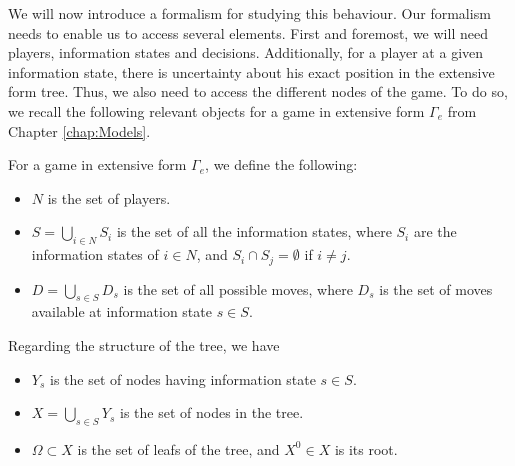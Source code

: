 We will now introduce a formalism for studying this behaviour. Our formalism needs to enable us to access several elements. First and foremost, we will need players, information states and decisions. Additionally, for  a player at a given information state, there is uncertainty about his exact position in the extensive form tree. Thus, we also need to access the different nodes of the game.
 To do so, we recall the following relevant objects for a game in extensive form $\Gamma_e$ from Chapter \ref{chap:Models}. \\

\begin{definition}
 For a game in extensive form $\Gamma_e$, we define the following:
\begin{itemize}
\item $N$ is the set of players.
\item $S =  \bigcup_{i \in N} S_i$ is the set of all the information states, where $S_i$ are the information states of $i \in N$, and $S_i \cap S_j = \emptyset$ if $i \neq j$.
\item $D = \bigcup_{s \in S} D_s$ is the set of all possible moves, where $D_s$ is the set of moves available at information state $s \in S$.
\end{itemize}
Regarding the structure of the tree, we have
\begin{itemize}
\item $Y_s$ is the  set of nodes having information state $s \in S$.
\item $X = \bigcup_{s \in S} Y_s$ is the set of nodes in the tree.
\item $\Omega \subset X$ is the set of leafs of the tree, and $X^0 \in X$ is its root.
\end{itemize}
\label{chap4:def:GameInExtForm}
\end{definition}

